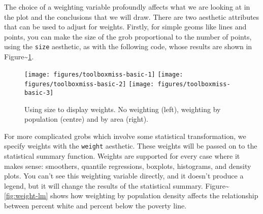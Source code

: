 \noindent The choice of a weighting variable profoundly affects what we
are looking at in the plot and the conclusions that we will draw. There
are two aesthetic attributes that can be used to adjust for weights.
Firstly, for simple geoms like lines and points, you can make the size
of the grob proportional to the number of points, using the
\texttt{size} aesthetic, as with the following code, whose results are
shown in Figure\textasciitilde{}\ref{fig:miss-basic}.

\begin{Shaded}
\begin{Highlighting}[]
 
 
   \StringTok{ }\NormalTok{) +}\StringTok{ }\NormalTok{(}\NormalTok{, }
   \NormalTok{(}\NormalTok{, }\NormalTok{, }\NormalTok{, }\NormalTok{))}
  \StringTok{ }
\StringTok{  }\NormalTok{()}
\end{Highlighting}
\end{Shaded}

\begin{figure}
\texttt{[image: figures/toolboxmiss-basic-1]} \texttt{[image: figures/toolboxmiss-basic-2]} \texttt{[image: figures/toolboxmiss-basic-3]} \caption{Using size to display weights. No weighting (left), weighting by population (centre) and by area (right).\label{fig:miss-basic}}
\end{figure}

For more complicated grobs which involve some statistical
transformation, we specify weights with the \texttt{weight} aesthetic.
These weights will be passed on to the statistical summary function.
Weights are supported for every case where it makes sense: smoothers,
quantile regressions, boxplots, histograms, and density plots. You can't
see this weighting variable directly, and it doesn't produce a legend,
but it will change the results of the statistical summary.
Figure\textasciitilde{}\ref{fig:weight-lm} shows how weighting by
population density affects the relationship between percent white and
percent below the poverty line.

